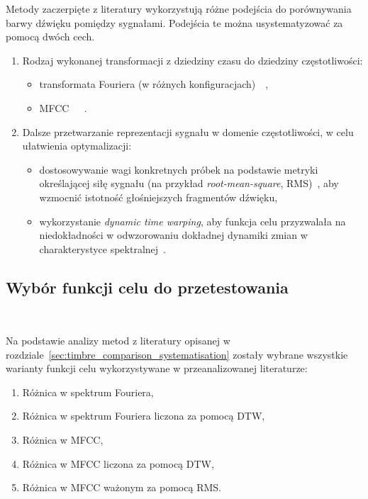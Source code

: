 Metody zaczerpięte z literatury wykorzystują różne podejścia do porównywania barwy dźwięku
pomiędzy sygnałami. Podejścia te można usystematyzować za pomocą dwóch cech.

\begin{enumerate}
  \item Rodzaj wykonanej transformacji z dziedziny czasu do dziedziny częstotliwości:
  \begin{itemize}
    \item transformata Fouriera (w różnych konfiguracjach)~\cite{riffusion}~\cite{ddx7},
    \item MFCC~\cite{ieee_synth_programming}~\cite{evolutionary_puredata}~\cite{mfcc_dtw}.
  \end{itemize}
  \item Dalsze przetwarzanie reprezentacji sygnału w domenie częstotliwości, w celu ułatwienia optymalizacji:
    \begin{itemize}
      \item dostosowywanie wagi konkretnych próbek na podstawie metryki określającej siłę sygnału
        (na przykład \textit{root-mean-square}, RMS)~\cite{parallel_evolutionary_optimization_synth_parameters},
        aby wzmocnić istotność głośniejszych fragmentów dźwięku,
      \item wykorzystanie \textit{dynamic time warping}, aby funkcja celu przyzwalała na
        niedokładności w odwzorowaniu dokładnej dynamiki zmian w charakterystyce spektralnej~\cite{mfcc_dtw}.
    \end{itemize}
\end{enumerate}

\subsection{Wybór funkcji celu do przetestowania}~\label{sec:considered_target_functions}

Na podstawie analizy metod z literatury opisanej w rozdziale~\ref{sec:timbre_comparison_systematisation} zostały wybrane wszystkie warianty
funkcji celu wykorzystywane w przeanalizowanej literaturze:

\begin{enumerate}
  \item Różnica w spektrum Fouriera,
  \item Różnica w spektrum Fouriera liczona za pomocą DTW,
  \item Różnica w MFCC,
  \item Różnica w MFCC liczona za pomocą DTW\@,
  \item Różnica w MFCC ważonym za pomocą RMS\@.
\end{enumerate}

